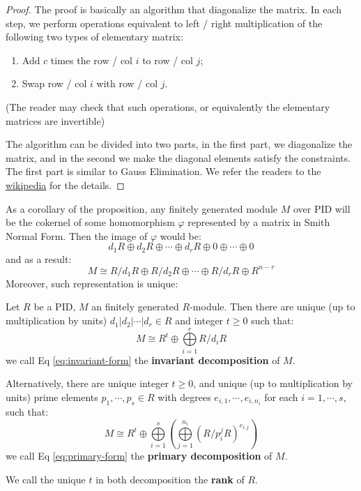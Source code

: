 \documentclass{note-eng}
\begin{document}
\begin{proof}
    The proof is basically an algorithm that diagonalize the matrix. In each step, we perform operations equivalent to left / right multiplication of the following two types of elementary matrix:
    \begin{enumerate}
        \item Add $c$ times the row / col $i$ to row / col $j$;
        \item Swap row / col $i$ with row / col $j$.
    \end{enumerate}
    (The reader may check that such operations, or equivalently the elementary matrices are invertible)

    The algorithm can be divided into two parts, in the first part, we diagonalize the matrix, and in the second we make the diagonal elements satisfy the constraints. The first part is similar to Gauss Elimination. We refer the readers to the \href{https://en.wikipedia.org/wiki/Smith_normal_form}{wikipedia} for the details.
\end{proof}

As a corollary of the proposition, any finitely generated module $M$ over PID will be the cokernel of some homomorphism $\varphi$ represented by a matrix in Smith Normal Form. Then the image of $\varphi$ would be:
$$d_1R \oplus d_2R \oplus \cdots \oplus d_rR \oplus 0 \oplus \cdots \oplus 0$$
and as a result:
$$M \cong R / d_1R \oplus R / d_2 R \oplus \cdots \oplus R / d_r R \oplus R^{n - r}$$
Moreover, such representation is unique:

\begin{theorem}
    Let $R$ be a PID, $M$ an finitely generated $R$-module. Then there are unique (up to multiplication by units) $d_1 | d_2 | \cdots | d_r \in R$ and integer $t \ge 0$ such that:
    \begin{equation}\label{eq:invariant-form}
        M \cong R^t \oplus \bigoplus\limits_{i = 1}^{r} R / d_iR
    \end{equation}
    we call Eq \ref{eq:invariant-form} the \textbf{invariant decomposition} of $M$.

    Alternatively, there are unique integer $t \ge 0$, and unique (up to multiplication by units) prime elements $p_1, \cdots, p_s \in R$ with degrees $e_{i, 1}, \cdots, e_{i, n_i}$ for each $i = 1, \cdots, s$, such that:
    \begin{equation}\label{eq:primary-form}
        M \cong R^t \oplus \bigoplus\limits_{i = 1}^{s} \left(\bigoplus\limits_{j = 1}^{n_i} (R / p_i^j R)^{e_{i, j}}\right)
    \end{equation}
    we call Eq \ref{eq:primary-form} the \textbf{primary decomposition} of $M$.

    We call the unique $t$ in both decomposition the \textbf{rank} of $R$.
\end{theorem}
\end{document}
